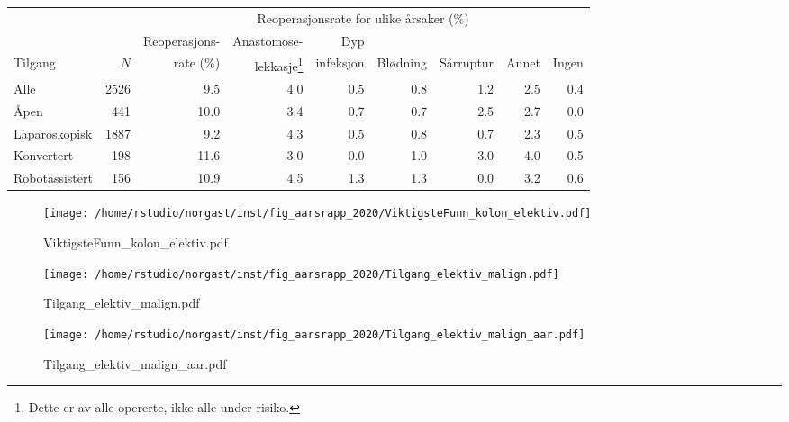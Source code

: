 \documentclass[norsk,a4paper]{article}\usepackage[]{graphicx}\usepackage[]{color}
\begin{document}
\begin{table}[htb]
\begin{minipage}{\textwidth}
\centering
\begin{tabular}{lrrrrrrrr}
  \toprule
  & & & \multicolumn{4}{c}{Reoperasjonsrate for ulike årsaker (\%)} \\
 \cline{4-9} 
 & & Reoperasjons- & Anastomose- & Dyp &&&&  \\
 Tilgang & $N$ & rate (\%) & lekkasje\footnote[2]{Dette er av alle opererte, ikke
alle under risiko.} & infeksjon & Blødning & Sårruptur & Annet & Ingen \\
 \midrule
Alle & 2526 & 9.5 & 4.0 & 0.5 & 0.8 & 1.2 & 2.5 & 0.4 \\ 
  Åpen & 441 & 10.0 & 3.4 & 0.7 & 0.7 & 2.5 & 2.7 & 0.0 \\ 
  Laparoskopisk & 1887 & 9.2 & 4.3 & 0.5 & 0.8 & 0.7 & 2.3 & 0.5 \\ 
  Konvertert & 198 & 11.6 & 3.0 & 0.0 & 1.0 & 3.0 & 4.0 & 0.5 \\ 
  Robotassistert & 156 & 10.9 & 4.5 & 1.3 & 1.3 & 0.0 & 3.2 & 0.6 \\ 
   \bottomrule
\end{tabular}

\end{minipage}
\end{table}




\begin{figure}[ht]
\centering
\texttt{[image: /home/rstudio/norgast/inst/fig\_aarsrapp\_2020/ViktigsteFunn\_kolon\_elektiv.pdf]}
\caption{ViktigsteFunn\_kolon\_elektiv.pdf}
\end{figure}

\begin{figure}[ht]
\centering
\texttt{[image: /home/rstudio/norgast/inst/fig\_aarsrapp\_2020/Tilgang\_elektiv\_malign.pdf]}
\caption{Tilgang\_elektiv\_malign.pdf}
\end{figure}

\begin{figure}[ht]
\centering
\texttt{[image: /home/rstudio/norgast/inst/fig\_aarsrapp\_2020/Tilgang\_elektiv\_malign\_aar.pdf]}
\caption{Tilgang\_elektiv\_malign\_aar.pdf}
\end{figure}
\end{document}
